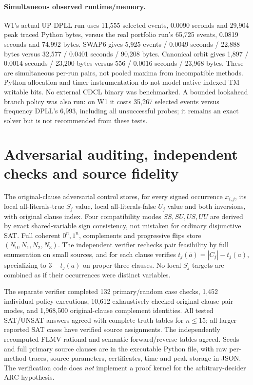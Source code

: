 \documentclass[10pt]{article}
\begin{document}
\paragraph{Simultaneous observed runtime/memory.}
W1's actual UP-DPLL run uses 11,555 selected events, 0.0090 seconds and 29,904 peak traced Python bytes, versus the real portfolio run's 65,725 events, 0.0819 seconds and 74,992 bytes. SWAP6 gives 5,925 events / 0.0049 seconds / 22,888 bytes versus 32,577 / 0.0401 seconds / 90,208 bytes. Canonical orbit gives 1,897 / 0.0014 seconds / 23,200 bytes versus 556 / 0.0016 seconds / 23,968 bytes. These are simultaneous per-run pairs, not pooled maxima from incompatible methods. Python allocation and timer instrumentation do not model native indexed-TM writable bits. No external CDCL binary was benchmarked. A bounded lookahead branch policy was also run: on W1 it costs 35,267 selected events versus frequency DPLL's 6,993, including all unsuccessful probes; it remains an exact solver but is not recommended from these tests.

\section{Adversarial auditing, independent checks and source fidelity}
The original-clause adversarial control stores, for every signed occurrence $x_{i,j}$, its local all-literals-true $S_j$ value, local all-literals-false $U_j$ value and both inversions, with original clause index. Four compatibility modes $SS,SU,US,UU$ are derived by exact shared-variable sign consistency, not mistaken for ordinary disjunctive SAT. Full coherent $0^n,1^n$, complements and progressive flips store $(N_0,N_1,N_2,N_3)$. The independent verifier rechecks pair feasibility by full enumeration on small sources, and for each clause verifies $t_j(\overline a)=|C_j|-t_j(a)$, specializing to $3-t_j(a)$ on proper three-clauses. No local $S_j$ targets are combined as if their occurrences were distinct variables.

The separate verifier completed 132 primary/random case checks, 1,452 individual policy executions, 10,612 exhaustively checked original-clause pair modes, and 1,968,500 original-clause complement identities. All tested SAT/UNSAT answers agreed with complete truth tables for $n\le15$; all larger reported SAT cases have verified source assignments. The independently recomputed FLMV rational and semantic forward/reverse tables agreed. Seeds and full primary source clauses are in the executable Python file, with raw per-method traces, source parameters, certificates, time and peak storage in JSON. The verification code does \emph{not} implement a proof kernel for the arbitrary-decider ARC hypothesis.
\end{document}
